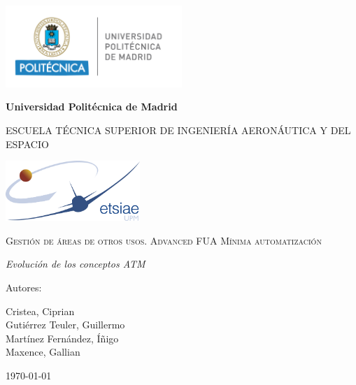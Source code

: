 \documentclass[12pt,a4paper,oneside]{book}
\begin{document}
\begin{titlepage}
\centering
{\includegraphics[width=0.5\textwidth]{logos/UPM}\par}
\vspace{0.1cm}
{\bfseries\LARGE Universidad Politécnica de Madrid \par}
\vspace{0.5cm}
{\scshape\large ESCUELA TÉCNICA SUPERIOR DE INGENIERÍA AERONÁUTICA Y DEL ESPACIO \par}
\vspace{0.25cm}
{\includegraphics[width=0.38\textwidth]{logos/ETSIAE} \par}
\vspace{1cm}
{\scshape\Large  Gestión de áreas de otros usos. Advanced FUA Mínima automatización \par}
\vspace{0.7cm}
{\itshape\large Evolución de los conceptos ATM \par}
\vfill
{\Large Autores: \par}
{\large Cristea, Ciprian \\ Gutiérrez Teuler, Guillermo \\ Martínez Fernández, Íñigo \\ Maxence, Gallian \par}
\vfill
{\Large \today \par}
\end{titlepage}

\frontmatter

{\hypersetup{linkcolor=black}		%
	\tableofcontents
	\cleardoublepage
	\listoffigures
	\cleardoublepage
	\listoftables
}

\printglossary[type=\acronymtype,title=Acrónimos,toctitle=Acrónimos]
\end{document}

